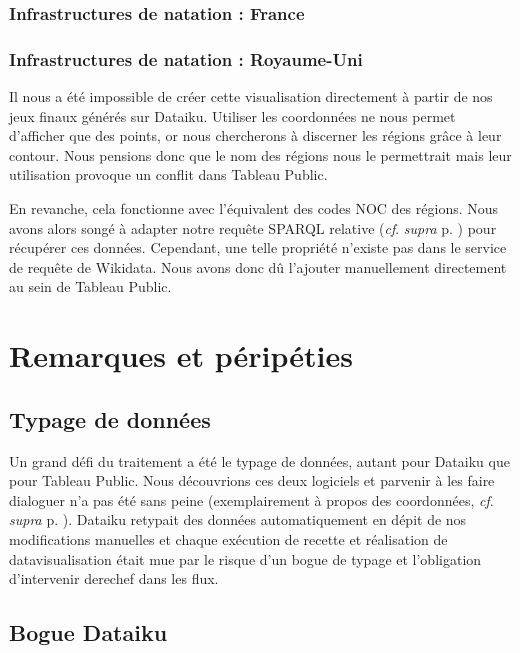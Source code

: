 \documentclass[hidelinks, 12pt]{report}
\begin{document}
\subsection{Infrastructures de natation : France}

\subsection{Infrastructures de natation : Royaume-Uni}

Il nous a été impossible de créer cette visualisation directement à partir de nos jeux finaux générés sur Dataiku. Utiliser les coordonnées ne nous permet d'afficher que des points, or nous chercherons à discerner les régions grâce à leur contour. Nous pensions donc que le nom des régions nous le permettrait mais leur utilisation provoque un conflit dans Tableau Public.

En revanche, cela fonctionne avec l'équivalent des codes NOC des régions. Nous avons alors songé à adapter notre requête SPARQL relative (\textit{cf}. \textit{supra} p. \pageref{queryeng}) pour récupérer ces données. Cependant, une telle propriété n'existe pas dans le service de requête de Wikidata. Nous avons donc dû l'ajouter manuellement directement au sein de Tableau Public.





%





\chapter{Remarques et péripéties}

\section{Typage de données}

Un grand défi du traitement a été le typage de données, autant pour Dataiku que pour Tableau Public. Nous découvrions ces deux logiciels et parvenir à les faire dialoguer n'a pas été sans peine (exemplairement à propos des coordonnées, \textit{cf}. \textit{supra} p. \pageref{casse}). Dataiku retypait des données automatiquement en dépit de nos modifications manuelles et chaque exécution de recette et réalisation de datavisualisation était mue par le risque d'un bogue de typage et l'obligation d'intervenir derechef dans les flux.

\section{Bogue Dataiku}
\end{document}
